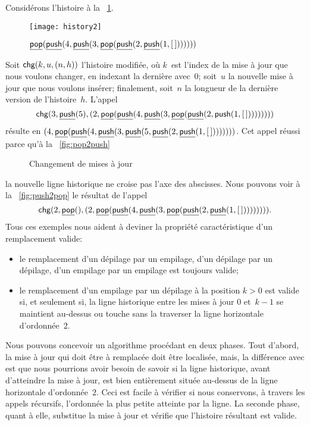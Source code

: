 Considérons l'histoire à la \fig~\ref{fig:history2}.
\begin{figure}[b]
\centering
\texttt{[image: history2]}%
\caption{$\underline{\textsf{pop}}(\underline{\textsf{push}}(4,\underline{\textsf{push}}(3,
          \underline{\textsf{pop}}(\underline{\textsf{push}}(2,\underline{\textsf{push}}(1,[\,]))))))$}
\label{fig:history2}
\end{figure}
Soit \(\textsf{chg}(k,u,({n},{h}))\) l'histoire modifiée, où \(k\)~est l'index de la mise à jour que nous voulons changer, en indexant la dernière avec~\(0\); soit~\(u\) la nouvelle mise à jour que nous voulons insérer; finalement, soit~\(n\) la longueur de la dernière version de l'histoire~\(h\). L'appel
\begin{equation*}
\textsf{chg}(3,\underline{\textsf{push}}(5),
  ({2},{\underline{\textsf{pop}}(\underline{\textsf{push}}(4,\underline{\textsf{push}}(3,
           \underline{\textsf{pop}}(\underline{\textsf{push}}(2,\textsf{push}(1,[\,]))))))}))
\end{equation*}
résulte en
\(({4},{\underline{\textsf{pop}}(\underline{\textsf{push}}(4,\underline{\textsf{push}}(3,\underline{\textsf{push}}(5,
  \underline{\textsf{push}}(2,\underline{\textsf{push}}(1,[\,]))))))})\). Cet appel réussi
parce qu'à la \fig~\ref{fig:pop2push}
\begin{figure}
\centering
{}
\quad
{}
\caption{Changement de mises à jour}
\end{figure}
la nouvelle ligne historique ne croise pas l'axe des abscisses. Nous
pouvons voir à la \fig~\ref{fig:push2pop} le résultat de l'appel
\begin{equation*}
\textsf{chg}(2,\underline{\textsf{pop}}(),
            ({2},{\underline{\textsf{pop}}(\underline{\textsf{push}}(4,\underline{\textsf{push}}(3,
                     \underline{\textsf{pop}}(\underline{\textsf{push}}(2,\underline{\textsf{push}}(1,[\,]))))))})).
\end{equation*}
Tous ces exemples nous aident à deviner la propriété caractéristique
d'un remplacement valide:
\begin{itemize}

  \item le remplacement d'un dépilage par un empilage, d'un dépilage par
  un dépilage, d'un empilage par un empilage est toujours valide;

  \item le remplacement d'un empilage par un dépilage à la position
    \(k>0\) est valide si, et seulement si, la ligne historique entre
    les mises à jour \(0\) et~\(k-1\) se maintient au-dessus ou touche
    sans la traverser la ligne horizontale d'ordonnée~\(2\).

\end{itemize}
Nous pouvons concevoir un algorithme procédant en deux phases. Tout
d'abord, la mise à jour qui doit être à remplacée doit être localisée,
mais, la différence avec  est que nous pourrions
avoir besoin de savoir si la ligne historique, avant d'atteindre la
mise à jour, est bien entièrement située au-dessus de la ligne
horizontale d'ordonnée~\(2\). Ceci est facile à vérifier si nous
conservons, à travers les appels récursifs, l'ordonnée la plus petite
atteinte par la ligne. La seconde phase, quant à elle, substitue la mise à jour et vérifie que l'histoire résultant est valide.

